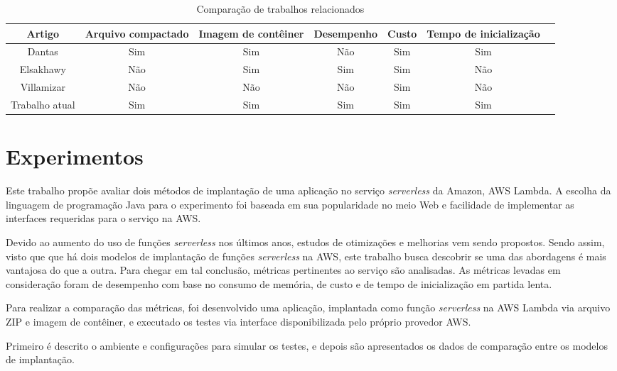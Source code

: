 \documentclass[conference]{IEEEtran}
\begin{document}
\begin{table}[htb]
    \centering
    \caption{Comparação de trabalhos relacionados}
    \label{tab:related_papers}
    \begin{tabular}{ccccccc}
        \hline
         Artigo & Arquivo compactado & Imagem de contêiner & Desempenho & Custo & Tempo de inicialização \\
        \hline
         Dantas\cite{dantas_2022_reducing_cold_start} & Sim & Sim & Não & Sim & Sim \\
        \hline
         Elsakhawy\cite{Elsakhawy_2021_performance_analysis_serverless} & Não  & Sim & Sim & Sim & Não \\
        \hline
         Villamizar\cite{Villamizar_2017_cost_comparison_lambda} & Não & Não & Não & Sim & Não \\
        \hline
         Trabalho atual & Sim & Sim & Sim & Sim & Sim \\
        \hline
    \end{tabular}   
\end{table}

\section{Experimentos}
\label{sec:experiments}

Este trabalho propõe avaliar dois métodos de implantação de uma aplicação no serviço \textit{serverless} da Amazon, AWS Lambda.
A escolha da linguagem de programação Java para o experimento foi baseada em sua popularidade no meio Web e facilidade de implementar as interfaces requeridas para o serviço na AWS.

Devido ao aumento do uso de funções \textit{serverless} nos últimos anos, estudos de otimizações e melhorias vem sendo propostos. Sendo assim, visto que que há dois modelos de implantação de funções \textit{serverless} na AWS, este trabalho busca descobrir se uma das abordagens é mais vantajosa do que a outra. Para chegar em tal conclusão, métricas pertinentes ao serviço são analisadas. As métricas levadas em consideração foram de desempenho com base no consumo de memória, de custo e de tempo de inicialização em partida lenta. 

Para realizar a comparação das métricas, foi desenvolvido uma aplicação, implantada como função \textit{serverless} na AWS Lambda via arquivo ZIP e imagem de contêiner, e executado os testes via interface disponibilizada pelo próprio provedor AWS. 

Primeiro é descrito o ambiente e configurações para simular os testes, e depois são apresentados os dados de comparação entre os modelos de implantação.
\end{document}
